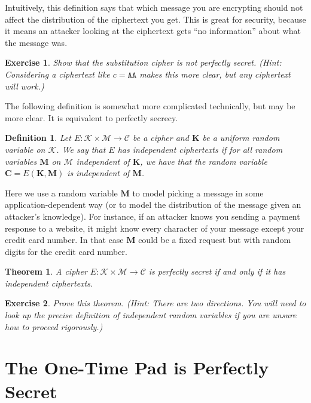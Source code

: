 \documentclass[11pt]{article}
\newtheorem{exercise}{Exercise}
\newtheorem{theorem}{Theorem}
\newtheorem{definition}{Definition}
\newcommand{\msgs}{\mathcal{M}}
\newcommand{\ctxts}{\mathcal{C}}
\newcommand{\keys}{\mathcal{K}}
\newcommand{\enc}{E}
\newcommand{\bK}{\mathbf{K}}
\newcommand{\bM}{\mathbf{M}}
\newcommand{\bC}{\mathbf{C}}
\begin{document}
Intuitively, this definition says that which message you are encrypting
should not affect the distribution of the ciphertext you get. This is great
for security, because it means an attacker looking at the ciphertext gets
``no information'' about what the message was.

\begin{exercise}
    Show that the substitution cipher is not perfectly secret.  (Hint:
    Considering a ciphertext like $c=\mathtt{AA}$ makes this more clear, but
    any ciphertext will work.)
\end{exercise}


The following definition is somewhat more complicated technically, but may
be more clear. It is equivalent to perfectly secrecy.
\begin{definition} 
    Let $\enc : \keys\times\msgs \to \ctxts$ be a cipher and $\bK$ be a uniform
    random variable on $\keys$.  We say that $\enc$ has \emph{independent
    ciphertexts} if for all random variables $\bM$ on $\msgs$ independent of
    $\bK$, we have that the random variable $\bC = \enc(\bK,\bM)$ is
    independent of $\bM$.
\end{definition}
Here we use a random variable $\bM$ to model picking a message
in some application-dependent way (or to model the distribution of the message
given an attacker's knowledge). For instance, if an attacker knows you
sending a payment response to a website, it might know every character of your
message except your credit card number. In that case $\bM$ could be a fixed
request but with random digits for the credit card number.


\begin{theorem}
    A cipher $\enc : \keys\times\msgs \to \ctxts$ is perfectly secret
    if and only if it has independent ciphertexts.
\end{theorem}

\begin{exercise}
    Prove this theorem. (Hint: There are two directions. You will need
    to look up the precise definition of independent random variables
    if you are unsure how to proceed rigorously.)
\end{exercise}

\section{The One-Time Pad is Perfectly Secret}
\end{document}
